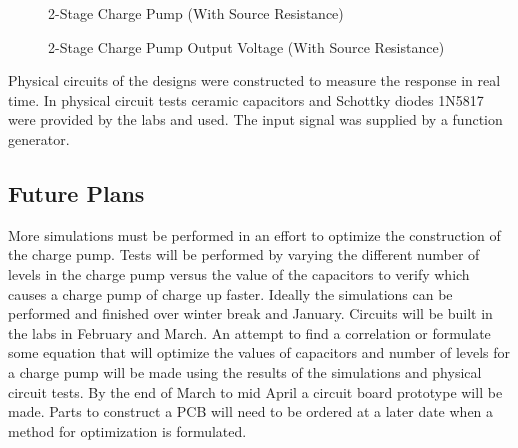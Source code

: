 \documentclass[12pt]{article}
\begin{document}
\vspace{0.5em}
\begin{figure}[H]
\caption{2-Stage Charge Pump (With Source Resistance)}
\label{fig:2SCP SR}
\end{figure}

\vspace{0.5em}
\begin{figure}[H]
\caption{2-Stage Charge Pump Output Voltage (With Source Resistance)}
\label{fig:2SCP SR Out}
\end{figure}

\noindent Physical circuits of the designs were constructed to measure the response in real time. In physical circuit tests ceramic capacitors and Schottky diodes 1N5817 were provided by the labs and used. The input signal was supplied by a function generator.

	\subsection{Future Plans}
	More simulations must be performed in an effort to optimize the construction of the charge pump. Tests will be performed by varying the different number of levels in the charge pump versus the value of the capacitors to verify which causes a charge pump of charge up faster. Ideally the simulations can be performed and finished over winter break and January. Circuits will be built in the labs in February and March. An attempt to find a correlation or formulate some equation that will optimize the values of capacitors and number of levels for a charge pump will be made using the results of the simulations and physical circuit tests. By the end of March to mid April a circuit board prototype will be made. Parts to construct a PCB will need to be ordered at a later date when a method for optimization is formulated.
	
\end{document}
